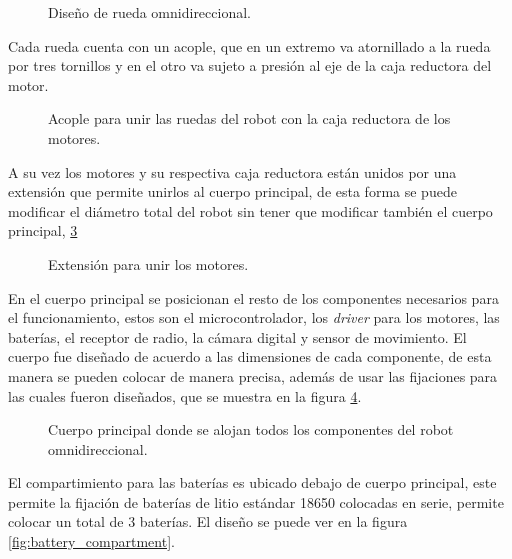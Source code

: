 \documentclass{iccmemoria}
\begin{document}
\begin{figure}[H]
  \centering
  
  \caption[Rueda omnidireccional.]{Diseño de rueda omnidireccional.}
  \label{fig:image_omni_whell_2}
\end{figure}

Cada rueda cuenta con un acople, que en un extremo va atornillado a la rueda por tres tornillos y en el otro va sujeto a presión al eje de la caja reductora del motor.\\

\begin{figure}[H]
  \centering
  
  \caption[Acople entre la rueda y la caja reductora.]{Acople para unir las ruedas del robot con la caja reductora de los motores.}
  \label{fig:arm}
\end{figure}

A su vez los motores y su respectiva caja reductora están unidos por una extensión que permite unirlos al cuerpo principal, de esta forma se puede modificar el diámetro total del robot sin tener que modificar también el cuerpo principal, \ref{fig:arm}\\

\begin{figure}[H]
  \centering
  
  \caption[Extensión para unir los motores.]{Extensión para unir los motores.}
  \label{fig:arm}
\end{figure}

En el cuerpo principal se posicionan el resto de los componentes necesarios para el funcionamiento, estos son el microcontrolador, los \emph{driver} para los motores, las baterías, el receptor de radio, la cámara digital y sensor de movimiento. El cuerpo fue diseñado de acuerdo a las dimensiones de cada componente, de esta manera se pueden colocar de manera precisa, además de usar las fijaciones para las cuales fueron diseñados, que se muestra en la figura \ref{fig:frame}.\\

\begin{figure}[H]
  \centering
  
  \caption[Cuerpo principal robot omnidireccional.]{Cuerpo principal donde se alojan todos los componentes del robot omnidireccional.}
  \label{fig:frame}
\end{figure}

El compartimiento para las baterías es ubicado debajo de cuerpo principal, este permite la fijación de baterías de litio estándar 18650 colocadas en serie, permite colocar un total de 3 baterías. El diseño se puede ver en la figura \ref{fig:battery_compartment}.
\end{document}
